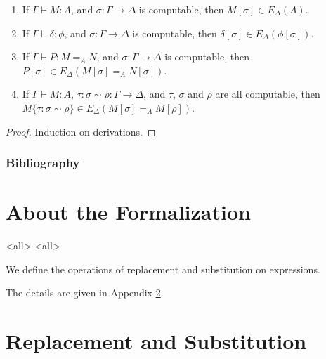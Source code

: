\begin{theorem}
$ $
\begin{enumerate}
\item
If $\Gamma \vdash M : A$, and $\sigma : \Gamma \rightarrow \Delta$ is computable,
then $M [ \sigma ] \in E_\Delta(A)$.
\item
If $\Gamma \vdash \delta : \phi$, and $\sigma : \Gamma \rightarrow \Delta$ is computable,
then $\delta [ \sigma ] \in E_\Delta(\phi[\sigma])$.
\item
If $\Gamma \vdash P : M =_A N$, and $\sigma : \Gamma \rightarrow \Delta$ is computable,
then $P [ \sigma ] \in E_\Delta(M [ \sigma ] =_A N [ \sigma ])$.
\item
If $\Gamma \vdash M : A$, $\tau : \sigma \sim \rho : \Gamma \rightarrow \Delta$, and $\tau$, $\sigma$
and $\rho$ are all computable, then $M \{ \tau : \sigma \sim \rho \} \in E_\Delta(M [ \sigma ] =_A M [ \rho ])$.
\end{enumerate}
\end{theorem}

\begin{proof}
Induction on derivations.
\end{proof}

\todos

\begin{frame}
\frametitle{Bibliography}

\end{frame}

\appendix

\section{About the Formalization}


\mode<all>{}
\mode<all>{}

We define the operations of replacement and substitution on
expressions.  




The details are given in Appendix \ref{appendix:repsub}.




%
%
%

\section{Replacement and Substitution}
\label{appendix:repsub}














